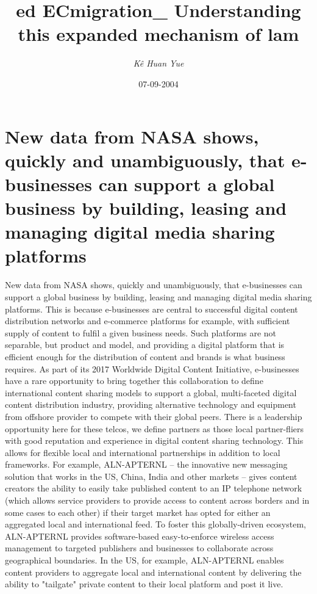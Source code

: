 \documentclass{article}%
\title{ed ECmigration\_ Understanding this expanded mechanism of lam}%
\author{\textit{Kê Huan Yue}}%
\date{07-09-2004}%
\begin{document}
%
\normalsize%
\maketitle%
\section{\newline%
New data from NASA shows, quickly and unambiguously, that e{-}businesses can support a global business by building, leasing and managing digital media sharing platforms}%
\label{sec:NewdatafromNASAshows,quicklyandunambiguously,thate{-}businessescansupportaglobalbusinessbybuilding,leasingandmanagingdigitalmediasharingplatforms}%
\newline%
New data from NASA shows, quickly and unambiguously, that e{-}businesses can support a global business by building, leasing and managing digital media sharing platforms. This is because e{-}businesses are central to successful digital content distribution networks and e{-}commerce platforms for example, with sufficient supply of content to fulfil a given business needs. Such platforms are not separable, but product and model, and providing a digital platform that is efficient enough for the distribution of content and brands is what business requires.\newline%
As part of its 2017 Worldwide Digital Content Initiative, e{-}businesses have a rare opportunity to bring together this collaboration to define international content sharing models to support a global, multi{-}faceted digital content distribution industry, providing alternative technology and equipment from offshore provider to compete with their global peers. There is a leadership opportunity here for these telcos, we define partners as those local partner{-}fliers with good reputation and experience in digital content sharing technology. This allows for flexible local and international partnerships in addition to local frameworks.\newline%
For example, ALN{-}APTERNL – the innovative new messaging solution that works in the US, China, India and other markets – gives content creators the ability to easily take published content to an IP telephone network (which allows service providers to provide access to content across borders and in some cases to each other) if their target market has opted for either an aggregated local and international feed.\newline%
To foster this globally{-}driven ecosystem, ALN{-}APTERNL provides software{-}based easy{-}to{-}enforce wireless access management to targeted publishers and businesses to collaborate across geographical boundaries. In the US, for example, ALN{-}APTERNL enables content providers to aggregate local and international content by delivering the ability to "tailgate" private content to their local platform and post it live.\newline%
\end{document}
